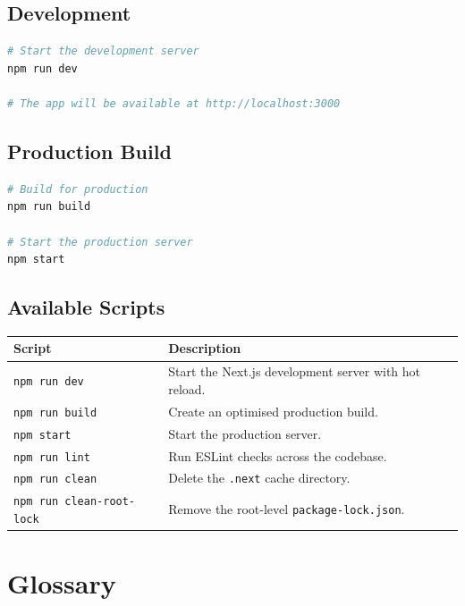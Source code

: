 \documentclass[12pt, a4paper, oneside]{report}
\begin{document}
\section{Development}

\begin{lstlisting}[language=bash, caption={Development Server}]
# Start the development server
npm run dev

# The app will be available at http://localhost:3000
\end{lstlisting}

\section{Production Build}

\begin{lstlisting}[language=bash, caption={Production Build}]
# Build for production
npm run build

# Start the production server
npm start
\end{lstlisting}

\section{Available Scripts}

\begin{longtable}{p{4.5cm} p{8.5cm}}
\toprule
\textbf{Script} & \textbf{Description} \\
\midrule
\endhead
\texttt{npm run dev} & Start the Next.js development server with hot reload. \\
\texttt{npm run build} & Create an optimised production build. \\
\texttt{npm start} & Start the production server. \\
\texttt{npm run lint} & Run ESLint checks across the codebase. \\
\texttt{npm run clean} & Delete the \texttt{.next} cache directory. \\
\texttt{npm run clean-root-lock} & Remove the root-level \texttt{package-lock.json}. \\
\bottomrule
\end{longtable}


\chapter{Glossary}
\end{document}
